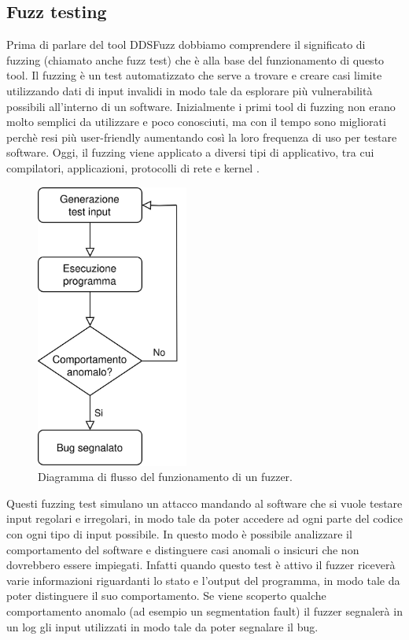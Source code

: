 \subsection{Fuzz testing}
Prima di parlare del tool DDSFuzz dobbiamo comprendere 
il significato di fuzzing (chiamato anche fuzz test) che è
alla base del funzionamento di questo tool. Il fuzzing è un test
automatizzato che serve a trovare e creare casi limite utilizzando
dati di input invalidi in modo tale da esplorare più vulnerabilità
possibili all'interno di un software. 
Inizialmente i primi tool di fuzzing non erano molto 
semplici da utilizzare e poco conosciuti, 
ma con il tempo
sono migliorati perchè resi più user-friendly aumentando così la 
loro frequenza di uso per testare software. Oggi, il fuzzing viene
applicato a diversi tipi di applicativo, tra cui compilatori, 
applicazioni, protocolli di rete e kernel \cite{8371326}.

\begin{figure}[H]
    \centering
    \includegraphics[width=5cm, keepaspectratio]{img/Diagramma di flusso fuzzer.jpg}
    \caption{Diagramma di flusso del funzionamento di un fuzzer.}
    \label{funzionamento fuzzer}
\end{figure}

Questi fuzzing test simulano un attacco mandando al software
che si vuole testare input regolari e irregolari, 
in modo tale da poter 
accedere ad ogni parte del codice con ogni tipo di input possibile.
In questo modo è possibile analizzare il comportamento del software
e distinguere casi anomali o insicuri che non dovrebbero
essere impiegati. Infatti quando questo test è attivo il fuzzer riceverà
varie informazioni riguardanti lo stato e l'output del programma, in 
modo tale da poter distinguere il suo comportamento. Se viene scoperto
qualche comportamento anomalo (ad esempio un segmentation fault) il 
fuzzer segnalerà in un log gli input utilizzati in modo tale da poter 
segnalare il bug.

